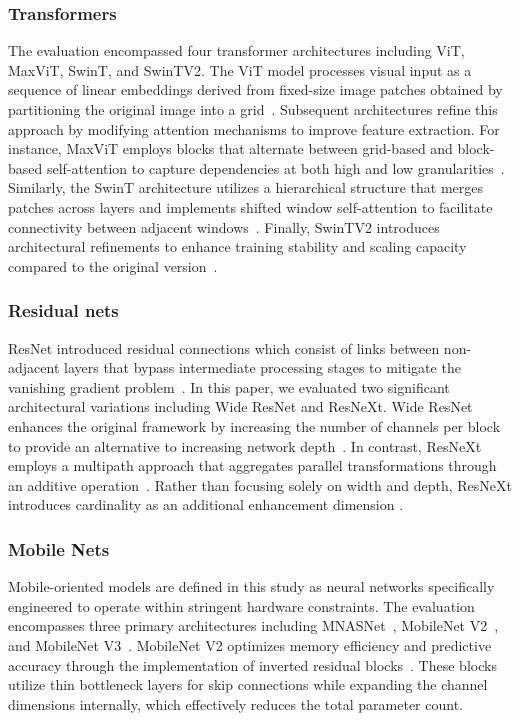 \documentclass[final,3p,times,twocolumn]{elsarticle}
\begin{document}
\subsubsection{Transformers}

The evaluation encompassed four transformer architectures including \gls{ViT}, \gls{MaxViT}, \gls{SwinT}, and \gls{SwinTV2}.
The \gls{ViT} model processes visual input as a sequence of linear embeddings derived from fixed-size image patches obtained by partitioning the original image into a grid~\cite{VisionTransformer}.
Subsequent architectures refine this approach by modifying attention mechanisms to improve feature extraction.
For instance, \gls{MaxViT} employs blocks that alternate between grid-based and block-based self-attention to capture dependencies at both high and low granularities~\cite{MaxViT}.
Similarly, the \gls{SwinT} architecture utilizes a hierarchical structure that merges patches across layers and implements shifted window self-attention to facilitate connectivity between adjacent windows~\cite{SwinTransformer}.
Finally, \gls{SwinTV2} introduces architectural refinements to enhance training stability and scaling capacity compared to the original version~\cite{SwinTransformerV2}.

\subsubsection{Residual nets}

ResNet introduced residual connections which consist of links between non-adjacent layers that bypass intermediate processing stages to mitigate the vanishing gradient problem~\cite{ResNet}.
In this paper, we evaluated two significant architectural variations including Wide ResNet and ResNeXt.
Wide ResNet enhances the original framework by increasing the number of channels per block to provide an alternative to increasing network depth~\cite{WideResNet}.
In contrast, ResNeXt employs a multipath approach that aggregates parallel transformations through an additive operation~\cite{ResNeXt}.
Rather than focusing solely on width and depth, ResNeXt introduces cardinality as an additional enhancement dimension .

\subsubsection{Mobile Nets}

Mobile-oriented models are defined in this study as neural networks specifically engineered to operate within stringent hardware constraints.
The evaluation encompasses three primary architectures including MNASNet~\cite{MNASNet}, MobileNet V2~\cite{MobileNetV2}, and MobileNet V3~\cite{MobileNetV3}.
MobileNet V2 optimizes memory efficiency and predictive accuracy through the implementation of inverted residual blocks~\cite{MobileNetV2}.
These blocks utilize thin bottleneck layers for skip connections while expanding the channel dimensions internally, which effectively reduces the total parameter count.
\end{document}
